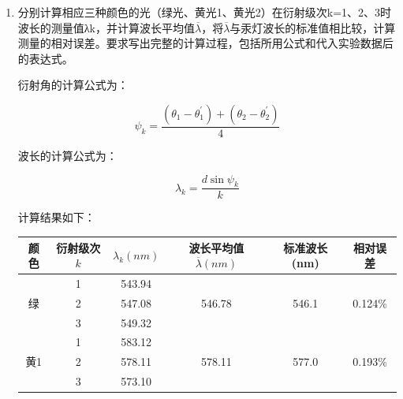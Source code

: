 \documentclass[signature=data]{physicsreport}
\begin{document}
\begin{enumerate}
    \item 分别计算相应三种颜色的光（绿光、黄光1、黄光2）在衍射级次k=1、2、3时波长的测量值λk，并计算波长平均值$\overline \lambda$，将$\overline \lambda$与汞灯波长的标准值相比较，计算测量的相对误差。要求写出完整的计算过程，包括所用公式和代入实验数据后的表达式。
    
    衍射角的计算公式为：

    $$\psi_k=\frac{(\theta_1-\theta_1^\prime)+(\theta_2-\theta_2^\prime)}{4}$$

    波长的计算公式为：

    $$\lambda_k=\frac{d\sin\psi_k}{k}$$

    计算结果如下：

\begin{table}[h]
    \centering
    \begin{tabular}{|c|c|c|c|c|c|}
    \hline
    颜色                 & 衍射级次 $k$ & $\lambda_k(nm)$ & 波长平均值 $\overline{\lambda}(nm)$ & 标准波长(nm)           & 相对误差         \\ \hline
    \multirow{3}{*}{绿} & 1                                                  & 543.94          & \multirow{3}{*}{546.78}        & \multirow{3}{*}{546.1} & \multirow{3}{*}{0.124\%} \\ \cline{2-3}
                        & 2                                                  & 547.08         &                           &                    &                    \\ \cline{2-3}
                        & 3                                                  & 549.32            &                           &                    &                    \\ \hline
    \multirow{3}{*}{黄1}  & 1                                                  & 583.12            & \multirow{3}{*}{578.11}         & \multirow{3}{*}{577.0}  & \multirow{3}{*}{0.193\%}  \\ \cline{2-3}
                        & 2                                                  & 578.11            &                           &                    &                    \\ \cline{2-3}
                        & 3                                                 & 573.10            &                           &                    &                    \\ \hline

\end{tabular}
\end{table}
\end{enumerate}
\end{document}
